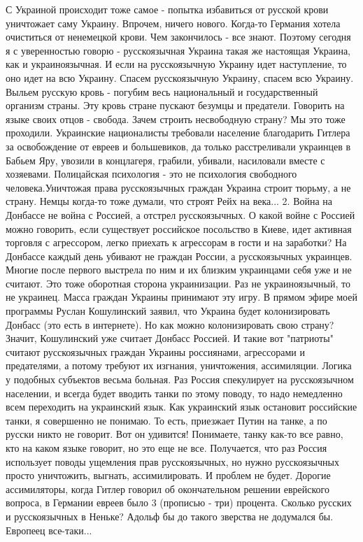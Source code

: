 С Украиной происходит тоже самое - попытка избавиться от русской крови уничтожает саму Украину. Впрочем, ничего нового. Когда-то Германия хотела очиститься от ненемецкой крови. Чем закончилось - все знают. 
Поэтому сегодня я с уверенностью говорю - русскоязычная Украина такая же настоящая Украина, как и  украиноязычная. И если на русскоязычную Украину идет наступление, то оно идет на всю Украину. Спасем русскоязычную Украину, спасем всю Украину. Выльем русскую кровь - погубим весь национальный и государственный организм страны. Эту кровь стране пускают безумцы и предатели. 
Говорить на языке своих отцов - свобода. Зачем строить несвободную страну? Мы это тоже проходили. Украинские националисты требовали население благодарить Гитлера за освобождение от евреев и большевиков, да только расстреливали украинцев в Бабьем Яру, увозили в концлагеря, грабили, убивали, насиловали вместе с хозяевами. Полицайская психология - это не психология свободного человека.Уничтожая права русскоязычных граждан Украина строит тюрьму, а не страну. Немцы когда-то тоже думали, что строят Рейх на века...
2. Война на Донбассе не война с Россией, а отстрел русскоязычных. 
О какой войне с Россией можно говорить, если существует российское посольство в Киеве, идет активная торговля с агрессором, легко приехать к агрессорам в гости и на заработки? На Донбассе каждый день убивают не граждан России, а русскоязычных украинцев. Многие после первого выстрела по ним и их близким украинцами себя уже и не считают. Это тоже оборотная сторона украинизации. Раз не украиноязычный, то не украинец. Масса граждан Украины принимают эту игру. 
В прямом эфире моей программы  Руслан Кошулинский заявил, что Украина будет колонизировать Донбасс (это есть в интернете). Но как можно колонизировать свою страну? Значит, Кошулинский уже считает Донбасс Россией. И такие вот "патриоты" считают русскоязычных граждан Украины россиянами, агрессорами и предателями, а потому требуют их изгнания, уничтожения, ассимиляции. 
Логика у подобных субъектов весьма больная. Раз Россия спекулирует на русскоязычном населении, и всегда будет вводить танки по этому поводу, то надо немедленно всем переходить на украинский язык. Как украинский язык остановит российские танки, я совершенно не понимаю. То есть, приезжает Путин на танке, а по русски никто не говорит. Вот он удивится!
Понимаете, танку как-то все равно, кто на каком языке говорит, но это еще не все. Получается, что раз Россия использует поводы ущемления прав русскоязычных, но нужно русскоязычных просто уничтожить, выгнать, ассимилировать. И проблем не будет. 
Дорогие ассимиляторы, когда Гитлер говорил об окончательном решении еврейского вопроса, в Германии евреев было 3 (прописью - три) процента. Сколько русских и русскоязычных в Неньке? Адольф бы до такого зверства не додумался бы. Европеец все-таки...
